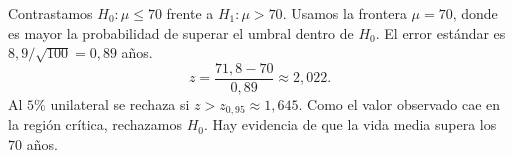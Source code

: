 Contrastamos $H_0:\mu\le70$ frente a $H_1:\mu>70$. Usamos la frontera $\mu=70$, donde es mayor la probabilidad de superar el umbral dentro de $H_0$. El error estándar es $8{,}9/\sqrt{100}=0{,}89$ años.
\[
z=\frac{71{,}8-70}{0{,}89}\approx2{,}022.
\]
Al $5\%$ unilateral se rechaza si $z>z_{0{,}95}\approx1{,}645$. Como el valor observado cae en la región crítica, rechazamos $H_0$. Hay evidencia de que la vida media supera los $70$ años.
